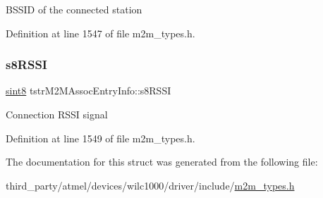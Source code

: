 B\+S\+S\+ID of the connected station 

Definition at line 1547 of file m2m\+\_\+types.\+h.

\mbox{\label{structtstrM2MAssocEntryInfo_a5483d51e0b6af2ecbc83870fab1bb508}} 
\subsubsection{\texorpdfstring{s8\+R\+S\+SI}{s8RSSI}}
{\footnotesize\ttfamily \hyperlink{group__DataT_gae35f10ffd0ac8dd2bc3e794da9bdfbc7}{sint8} tstr\+M2\+M\+Assoc\+Entry\+Info\+::s8\+R\+S\+SI}

Connection R\+S\+SI signal 

Definition at line 1549 of file m2m\+\_\+types.\+h.



The documentation for this struct was generated from the following file\+:\begin{DoxyCompactItemize}
\item 
third\+\_\+party/atmel/devices/wilc1000/driver/include/\hyperlink{m2m__types_8h}{m2m\+\_\+types.\+h}\end{DoxyCompactItemize}
